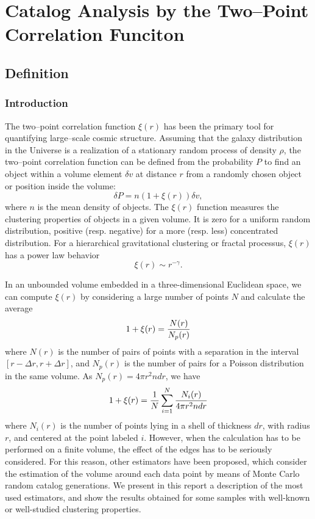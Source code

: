 
\chapter{ Catalog Analysis by the Two--Point Correlation Funciton}

\section{Definition}
\subsection{Introduction}
The two--point correlation function $\xi(r)$ has been the primary tool
for quantifying large--scale cosmic structure\cite{cf:peebles80}.
Assuming that the galaxy distribution in the Universe is a realization
of a stationary random process of density $\rho$, the two--point
correlation function can be defined from the probability $P$ to find
an object within a volume element $\delta v$ at distance $r$ from a
randomly chosen object or position inside the volume: 
\begin{equation} 
\delta P = n(1 + \xi(r))\delta v,
\end{equation} 
where $n$ is the mean density of objects.  The $\xi(r)$ function
measures the clustering properties of objects in a given volume. It is
zero for a uniform random distribution, positive (resp.  negative) for
a more (resp. less) concentrated distribution. For a hierarchical
gravitational clustering or fractal processus, $\xi(r)$ has a power
law behavior 
\begin{equation} 
\xi(r) \sim r^{-\gamma}.
\end{equation}

In an unbounded volume embedded in a three-dimensional Euclidean
space, we can compute $\xi(r)$ by considering a large number of points
$N$ and calculate the average
\begin{equation} 
1 + \xi(r) = {N(r) \over N_{p}(r)}
\end{equation} 
where $N(r)$ is the number of pairs of points with a separation in the
interval $[r-\Delta r, r+\Delta r]$, and $N_{p}(r)$ is the number of
pairs for a Poisson distribution in the same volume. As $N_{p}(r) =
4\pi r^2 n dr$, we have
\begin{equation} 
1 + \xi(r) = {1 \over N} \sum_{i=1}^N {N_i(r) \over 4\pi r^2 n dr} 
\end{equation} 
where $N_i(r)$ is the number of points lying in a shell of thickness
$dr$, with radius $r$, and centered at the point labeled $i$.
However, when the calculation has to be performed on a finite volume,
the effect of the edges has to be seriously considered.  For this
reason, other estimators have been proposed, which consider the
estimation of the volume around each data point by means of Monte
Carlo random catalog generations. We present in this report a
description of the most used estimators, and show the results obtained
for some samples with well-known or well-studied clustering
properties.



